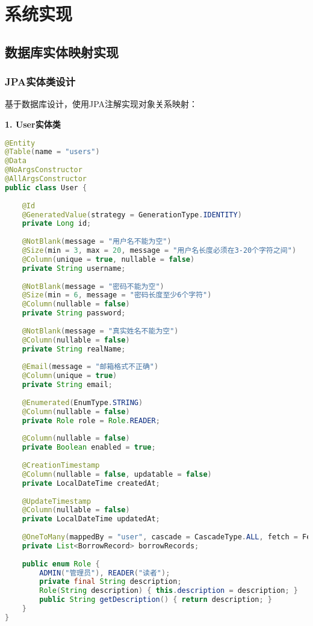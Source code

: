 \documentclass[12pt,a4paper]{article}
\begin{document}
\section{系统实现}

\subsection{数据库实体映射实现}

\subsubsection{JPA实体类设计}
基于数据库设计，使用JPA注解实现对象关系映射：

\textbf{1. User实体类}
\begin{lstlisting}[language=java]
@Entity
@Table(name = "users")
@Data
@NoArgsConstructor
@AllArgsConstructor
public class User {
    
    @Id
    @GeneratedValue(strategy = GenerationType.IDENTITY)
    private Long id;
    
    @NotBlank(message = "用户名不能为空")
    @Size(min = 3, max = 20, message = "用户名长度必须在3-20个字符之间")
    @Column(unique = true, nullable = false)
    private String username;
    
    @NotBlank(message = "密码不能为空")
    @Size(min = 6, message = "密码长度至少6个字符")
    @Column(nullable = false)
    private String password;
    
    @NotBlank(message = "真实姓名不能为空")
    @Column(nullable = false)
    private String realName;
    
    @Email(message = "邮箱格式不正确")
    @Column(unique = true)
    private String email;
    
    @Enumerated(EnumType.STRING)
    @Column(nullable = false)
    private Role role = Role.READER;
    
    @Column(nullable = false)
    private Boolean enabled = true;
    
    @CreationTimestamp
    @Column(nullable = false, updatable = false)
    private LocalDateTime createdAt;
    
    @UpdateTimestamp
    @Column(nullable = false)
    private LocalDateTime updatedAt;
    
    @OneToMany(mappedBy = "user", cascade = CascadeType.ALL, fetch = FetchType.LAZY)
    private List<BorrowRecord> borrowRecords;
    
    public enum Role {
        ADMIN("管理员"), READER("读者");
        private final String description;
        Role(String description) { this.description = description; }
        public String getDescription() { return description; }
    }
}
\end{lstlisting}
\end{document}
